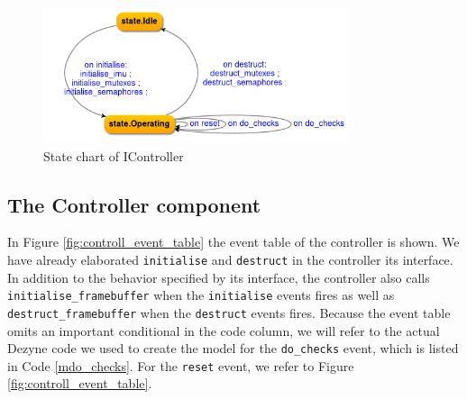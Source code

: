 \documentclass[12pt]{scrreprt}
\begin{document}
\begin{figure}[H]
    \centering
    \includegraphics[width=0.8\textwidth]{Figures/results/modelling_figures/IController/IController_state_chart.png}
    \caption{State chart of IController}
    \label{fig:IController_state_chart}
\end{figure}

\subsection{The Controller component}
\label{secController}
In Figure \ref{fig:controll_event_table} the event table of the controller is shown. We have already elaborated \texttt{initialise} and \texttt{destruct} in the controller its interface. In addition to the behavior specified by its interface, the controller also calls \texttt{initialise\_framebuffer} when the \texttt{initialise} events fires as well as \texttt{destruct\_framebuffer} when the \texttt{destruct} events fires. Because the event table omits an important conditional in the code column, we will refer to the actual Dezyne code we used to create the model for the \texttt{do\_checks} event, which is listed in Code \ref{mdo_checks}. For the \texttt{reset} event, we refer to Figure \ref{fig:controll_event_table}.
\par
\end{document}
